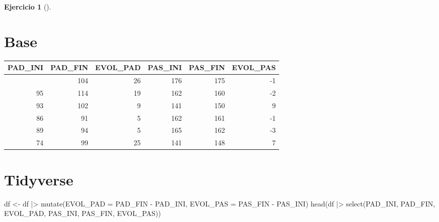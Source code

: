 \documentclass[
  a4paper,
]{scrreport}
\newenvironment{Shaded}{\begin{snugshade}}{\end{snugshade}}
\newcommand{\AttributeTok}[1]{\textcolor[rgb]{0.40,0.45,0.13}{#1}}
\newcommand{\FunctionTok}[1]{\textcolor[rgb]{0.28,0.35,0.67}{#1}}
\newcommand{\NormalTok}[1]{\textcolor[rgb]{0.00,0.23,0.31}{#1}}
\newcommand{\OtherTok}[1]{\textcolor[rgb]{0.00,0.23,0.31}{#1}}
\newcommand{\SpecialCharTok}[1]{\textcolor[rgb]{0.37,0.37,0.37}{#1}}
\newcommand{\StringTok}[1]{\textcolor[rgb]{0.13,0.47,0.30}{#1}}
\theoremstyle{definition}
\newtheorem{exercise}{Ejercicio}[chapter]
\theoremstyle{remark}
\begin{document}
\begin{exercise}[]
\begin{enumerate}
\begin{tcolorbox}
  \section{Base}

\begin{Shaded}
\end{Shaded}

  \begin{longtable}[]{@{}rrrrrr@{}}
  \toprule\noalign{}
  PAD\_INI & PAD\_FIN & EVOL\_PAD & PAS\_INI & PAS\_FIN & EVOL\_PAS \\
  \midrule\noalign{}
  \endhead
  \bottomrule\noalign{}
  \endlastfoot
  78 & 104 & 26 & 176 & 175 & -1 \\
  95 & 114 & 19 & 162 & 160 & -2 \\
  93 & 102 & 9 & 141 & 150 & 9 \\
  86 & 91 & 5 & 162 & 161 & -1 \\
  89 & 94 & 5 & 165 & 162 & -3 \\
  74 & 99 & 25 & 141 & 148 & 7 \\
  \end{longtable}

  \section{Tidyverse}

\begin{Shaded}
\begin{Highlighting}[]
\NormalTok{df }\OtherTok{\textless{}{-}}\NormalTok{ df }\SpecialCharTok{|\textgreater{}} \FunctionTok{mutate}\NormalTok{(}\AttributeTok{EVOL\_PAD =}\NormalTok{ PAD\_FIN }\SpecialCharTok{{-}}\NormalTok{ PAD\_INI, }\AttributeTok{EVOL\_PAS =}\NormalTok{ PAS\_FIN }\SpecialCharTok{{-}}\NormalTok{ PAS\_INI)}
\FunctionTok{head}\NormalTok{(df }\SpecialCharTok{|\textgreater{}} \FunctionTok{select}\NormalTok{(PAD\_INI, PAD\_FIN, EVOL\_PAD, PAS\_INI, PAS\_FIN, EVOL\_PAS))}
\end{Highlighting}
\end{Shaded}


\end{tcolorbox}
\end{enumerate}
\end{exercise}
\end{document}
